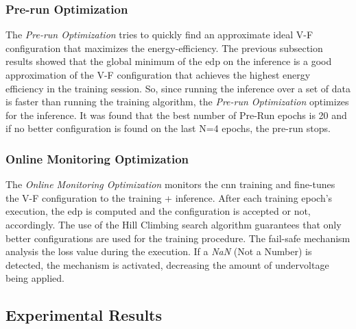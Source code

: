 \subsubsection{Pre-run Optimization}

The \textit{Pre-run Optimization} tries to quickly find an approximate ideal V-F configuration that maximizes the energy-efficiency. The previous subsection results showed that the global minimum of the \acrshort{edp} on the inference is a good approximation of the V-F configuration that achieves the highest energy efficiency in the training session. So, since running the inference over a set of data is faster than running the training algorithm, the \textit{Pre-run Optimization} optimizes for the inference. It was found that the best number of Pre-Run epochs is 20 and if no better configuration is found on the last N=4 epochs, the pre-run stops.

\subsubsection{Online Monitoring Optimization}

The \textit{Online Monitoring Optimization} monitors the \acrshort{cnn} training and fine-tunes the V-F configuration to the training + inference. After each training epoch's execution, the \acrshort{edp} is computed and the configuration is accepted or not, accordingly. The use of the Hill Climbing search algorithm guarantees that only better configurations are used for the training procedure. The fail-safe mechanism analysis the loss value during the execution. If a \textit{NaN} (Not a Number) is detected, the mechanism is activated, decreasing the amount of undervoltage being applied.


\subsection{Experimental Results}

